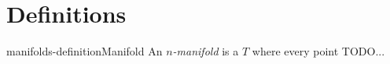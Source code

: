 \documentclass[preview]{standalone}
\begin{document}
\genpage

\section{Definitions}

\begin{snippetdefinition}{manifolds-definition}{Manifold}
    An \textit{\(n\)-manifold} is a \topologicalspace \(T\) where
    every point TODO... %
\end{snippetdefinition}
\end{document}
